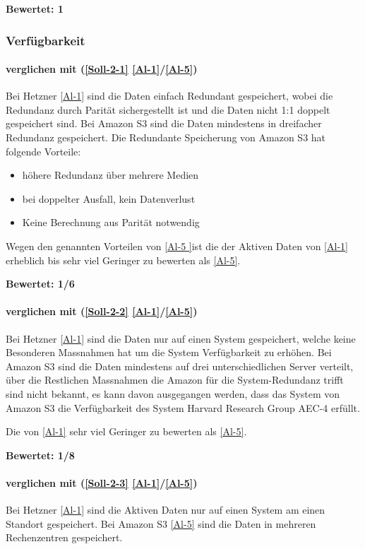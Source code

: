 \textbf{Bewertet: 1}


\subsubsection{Verfügbarkeit}

\paragraph*{  verglichen mit  (\ref{Soll-2-1} \ref{Al-1}/\ref{Al-5})}
Bei Hetzner \ref{Al-1} sind die Daten einfach Redundant gespeichert, wobei die Redundanz durch Parität sichergestellt ist und die Daten nicht 1:1 doppelt gespeichert sind. Bei Amazon S3 sind die Daten mindestens in dreifacher Redundanz gespeichert. Die Redundante Speicherung von Amazon S3 hat folgende Vorteile:

\begin{itemize}
\item höhere Redundanz über mehrere Medien
\item bei doppelter Ausfall, kein Datenverlust
\item Keine Berechnung aus Parität notwendig
\end{itemize}

Wegen den genannten Vorteilen von \ref{Al-5 }ist die  der Aktiven Daten von \ref{Al-1} erheblich bis sehr viel Geringer zu bewerten als \ref{Al-5}.

\textbf{Bewertet: 1/6}

\paragraph*{  verglichen mit  (\ref{Soll-2-2} \ref{Al-1}/\ref{Al-5})}
Bei Hetzner \ref{Al-1} sind die Daten nur auf einen System gespeichert, welche keine Besonderen Massnahmen hat um die System Verfügbarkeit zu erhöhen. Bei Amazon S3 sind die Daten mindestens auf drei unterschiedlichen Server verteilt, über die Restlichen Massnahmen die Amazon für die System-Redundanz trifft sind nicht bekannt, es kann davon ausgegangen werden, dass das System von Amazon S3 die Verfügbarkeit des System Harvard Research Group AEC-4 erfüllt.

Die  von \ref{Al-1} sehr viel Geringer zu bewerten als \ref{Al-5}.

\textbf{Bewertet: 1/8}

\paragraph*{  verglichen mit  (\ref{Soll-2-3} \ref{Al-1}/\ref{Al-5})}
Bei Hetzner \ref{Al-1} sind die Aktiven Daten nur auf einen System am einen Standort gespeichert. Bei Amazon S3 \ref{Al-5} sind die Daten in mehreren Rechenzentren gespeichert.

